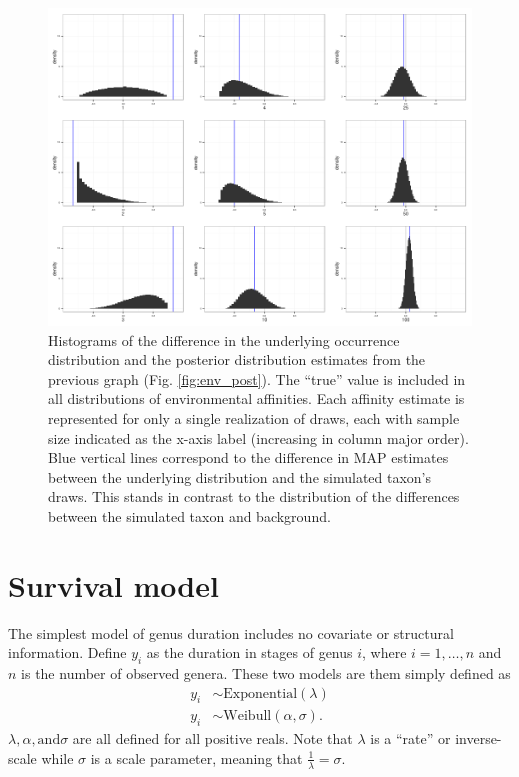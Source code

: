\documentclass[12pt,letterpaper]{article}
\begin{document}
\begin{figure}[ht]
  \centering
  \includegraphics[height = \textheight,width=\textwidth,keepaspectratio=true]{figure/env_diff}
  \caption{Histograms of the difference in the underlying occurrence distribution and the posterior distribution estimates from the previous graph (Fig. \ref{fig:env_post}). The ``true'' value is included in all distributions of environmental affinities. Each affinity estimate is represented for only a single realization of draws, each with sample size indicated as the x-axis label (increasing in column major order). Blue vertical lines correspond to the difference in MAP estimates between the underlying distribution and the simulated taxon's draws. This stands in contrast to the distribution of the differences between the simulated taxon and background.}
  \label{fig:env_diff}
\end{figure}

\section{Survival model} \label{sec:survival}

The simplest model of genus duration includes no covariate or structural information. Define \(y_{i}\) as the duration in stages of genus \(i\), where \(i = 1, \dots, n\) and \(n\) is the number of observed genera. These two models are them simply defined as
\begin{equation}
  \begin{aligned}
    y_{i} &\sim \mathrm{Exponential}(\lambda) \\
    y_{i} &\sim \mathrm{Weibull}(\alpha, \sigma).
  \end{aligned}
  \label{eq:simple}
\end{equation}
\(\lambda, \alpha, \text{and} \sigma\) are all defined for all positive reals. Note that \(\lambda\) is a ``rate'' or inverse-scale while \(\sigma\) is a scale parameter, meaning that \(\frac{1}{\lambda} = \sigma\).
\end{document}
